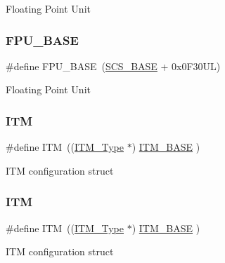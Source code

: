 Floating Point Unit \mbox{\label{group___c_m_s_i_s__core__base_ga4dcad4027118c098c07bcd575f1fbb28}} 
\subsubsection{\texorpdfstring{FPU\_BASE}{FPU\_BASE}\hspace{0.1cm}{\footnotesize\ttfamily [4/4]}}
{\footnotesize\ttfamily \#define F\+P\+U\+\_\+\+B\+A\+SE~(\mbox{\hyperlink{group___c_m_s_i_s__core__base_ga3c14ed93192c8d9143322bbf77ebf770}{S\+C\+S\+\_\+\+B\+A\+SE}} +  0x0\+F30\+U\+L)}

Floating Point Unit \mbox{\label{group___c_m_s_i_s__core__base_gabae7cdf882def602cb787bb039ff6a43}} 
\subsubsection{\texorpdfstring{ITM}{ITM}\hspace{0.1cm}{\footnotesize\ttfamily [1/6]}}
{\footnotesize\ttfamily \#define I\+TM~((\mbox{\hyperlink{struct_i_t_m___type}{I\+T\+M\+\_\+\+Type}}       $\ast$)     \mbox{\hyperlink{group___c_m_s_i_s__core__base_gadd76251e412a195ec0a8f47227a8359e}{I\+T\+M\+\_\+\+B\+A\+SE}}      )}

I\+TM configuration struct \mbox{\label{group___c_m_s_i_s__core__base_gabae7cdf882def602cb787bb039ff6a43}} 
\subsubsection{\texorpdfstring{ITM}{ITM}\hspace{0.1cm}{\footnotesize\ttfamily [2/6]}}
{\footnotesize\ttfamily \#define I\+TM~((\mbox{\hyperlink{struct_i_t_m___type}{I\+T\+M\+\_\+\+Type}}       $\ast$)     \mbox{\hyperlink{group___c_m_s_i_s__core__base_gadd76251e412a195ec0a8f47227a8359e}{I\+T\+M\+\_\+\+B\+A\+SE}}      )}

I\+TM configuration struct \mbox{\label{group___c_m_s_i_s__core__base_gabae7cdf882def602cb787bb039ff6a43}} 
